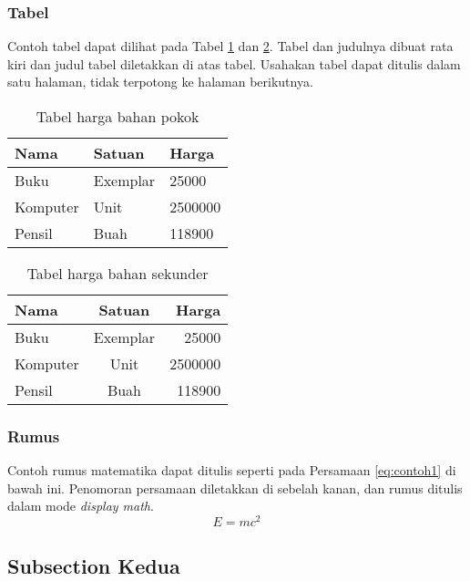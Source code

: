 \documentclass[12pt,a4paper,oneside]{book}
\begin{document}
\subsubsection{Tabel}
Contoh tabel dapat dilihat pada Tabel \ref{tbl:harga1} dan \ref{tbl:harga2}. Tabel dan judulnya dibuat rata kiri dan judul tabel diletakkan di atas tabel. Usahakan tabel dapat ditulis dalam satu halaman, tidak terpotong ke halaman berikutnya.

\begin{table}[t] %
\centering
	\begin{tabular}{ | p{2cm} | p{2cm} | p{3cm} |}
	\hline
	Nama 	& Satuan 		& Harga \\
	\hline
	Buku 	& Exemplar	& 25000 \\
	Komputer	& Unit		& 2500000 \\
	Pensil	& Buah		& 118900 \\
	\hline
	\end{tabular}
\caption{Tabel harga bahan pokok}
\label{tbl:harga1}
\end{table}

\begin{table}[h] %
\centering
	\begin{tabular}{ | l | c | r | }
	\hline
	Nama 	& Satuan 		& Harga \\
	\hline
	Buku 	& Exemplar	& 25000 \\
	Komputer	& Unit		& 2500000 \\
	Pensil	& Buah		& 118900 \\
	\hline
	\end{tabular}
\caption{Tabel harga bahan sekunder}
\label{tbl:harga2}
\end{table}

\subsubsection{Rumus}
Contoh rumus matematika dapat ditulis seperti pada Persamaan \ref{eq:contoh1} di bawah ini. 
Penomoran persamaan diletakkan di sebelah kanan, dan rumus ditulis dalam mode \textit{display math}.
\begin{equation}
E = mc^2
\label{eq:contoh1}
\end{equation}

\subsection{Subsection Kedua}
\lipsum[3]
\end{document}
